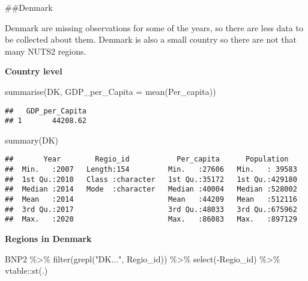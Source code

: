 \documentclass[
]{article}
\newenvironment{Shaded}{\begin{snugshade}}{\end{snugshade}}
\newcommand{\AttributeTok}[1]{\textcolor[rgb]{0.77,0.63,0.00}{#1}}
\newcommand{\FunctionTok}[1]{\textcolor[rgb]{0.00,0.00,0.00}{#1}}
\newcommand{\NormalTok}[1]{#1}
\newcommand{\SpecialCharTok}[1]{\textcolor[rgb]{0.00,0.00,0.00}{#1}}
\newcommand{\StringTok}[1]{\textcolor[rgb]{0.31,0.60,0.02}{#1}}
\begin{document}
\#\#Denmark

Denmark are missing observations for some of the years, so there are
less data to be collected about them. Denmark is also a small country so
there are not that many NUTS2 regions.

\textbf{Country level}

\begin{Shaded}
\begin{Highlighting}[]
    \FunctionTok{summarise}\NormalTok{(DK, }\AttributeTok{GDP\_per\_Capita =} \FunctionTok{mean}\NormalTok{(Per\_capita))}
\end{Highlighting}
\end{Shaded}

\begin{verbatim}
##   GDP_per_Capita
## 1       44208.62
\end{verbatim}

\begin{Shaded}
\begin{Highlighting}[]
\FunctionTok{summary}\NormalTok{(DK)}
\end{Highlighting}
\end{Shaded}

\begin{verbatim}
##       Year        Regio_id           Per_capita      Population    
##  Min.   :2007   Length:154         Min.   :27606   Min.   : 39583  
##  1st Qu.:2010   Class :character   1st Qu.:35172   1st Qu.:429180  
##  Median :2014   Mode  :character   Median :40004   Median :528002  
##  Mean   :2014                      Mean   :44209   Mean   :512116  
##  3rd Qu.:2017                      3rd Qu.:48033   3rd Qu.:675962  
##  Max.   :2020                      Max.   :86083   Max.   :897129
\end{verbatim}

\textbf{Regions in Denmark}

\begin{Shaded}
\begin{Highlighting}[]
\NormalTok{BNP2 }\SpecialCharTok{\%\textgreater{}\%}
  \FunctionTok{filter}\NormalTok{(}\FunctionTok{grepl}\NormalTok{(}\StringTok{"DK..."}\NormalTok{, Regio\_id)) }\SpecialCharTok{\%\textgreater{}\%}
  \FunctionTok{select}\NormalTok{(}\SpecialCharTok{{-}}\NormalTok{Regio\_id) }\SpecialCharTok{\%\textgreater{}\%}
\NormalTok{  vtable}\SpecialCharTok{::}\FunctionTok{st}\NormalTok{(.)}
\end{Highlighting}
\end{Shaded}
\end{document}
